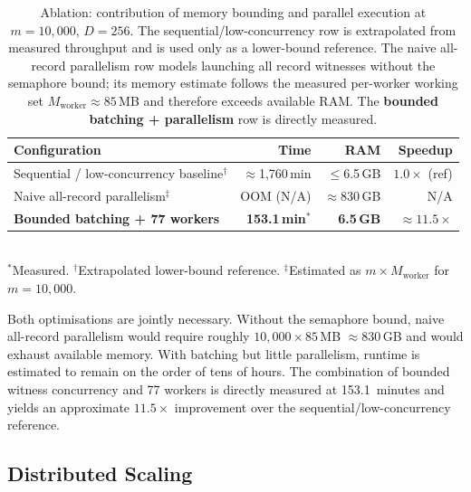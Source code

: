 \documentclass[preprint,12pt]{elsarticle}
\begin{document}
\begin{table}[t]
\centering
\caption{Ablation: contribution of memory bounding and parallel execution at
$m=10{,}000$, $D=256$. The sequential/low-concurrency row is extrapolated from
measured throughput and is used only as a lower-bound reference. The naive
all-record parallelism row models launching all record witnesses without the
semaphore bound; its memory estimate follows the measured per-worker working
set $M_{\text{worker}}\approx 85$\,MB and therefore exceeds available RAM. The
\textbf{bounded batching + parallelism} row is directly measured.}
\label{tab:ablation}
\begin{tabular}{@{}l r r r@{}}
\toprule
\textbf{Configuration} & \textbf{Time} & \textbf{RAM} & \textbf{Speedup} \\
\midrule
Sequential / low-concurrency baseline$^\dagger$ & $\approx$1{,}760\,min & $\leq$6.5\,GB & $1.0\times$ (ref) \\
Naive all-record parallelism$^\ddagger$         & OOM (N/A) & $\approx$830\,GB & N/A \\
\textbf{Bounded batching + 77 workers}          & \textbf{153.1\,min}$^*$ & \textbf{6.5\,GB} & $\mathbf{\approx 11.5\times}$ \\
\bottomrule
\end{tabular}
\smallskip\\
{\small $^*$Measured. $^\dagger$Extrapolated lower-bound reference. $^\ddagger$Estimated as $m\times M_{\text{worker}}$ for $m=10{,}000$.}
\end{table}

Both optimisations are jointly necessary. Without the semaphore bound, naive
all-record parallelism would require roughly $10{,}000 \times 85$\,MB
$\approx 830$\,GB and would exhaust available memory. With batching but little
parallelism, runtime is estimated to remain on the order of tens of hours. The
combination of bounded witness concurrency and 77 workers is directly measured
at 153.1~minutes and yields an approximate $11.5\times$ improvement over the
sequential/low-concurrency reference.

\subsection{Distributed Scaling}
\label{subsec:distributed}
\end{document}
